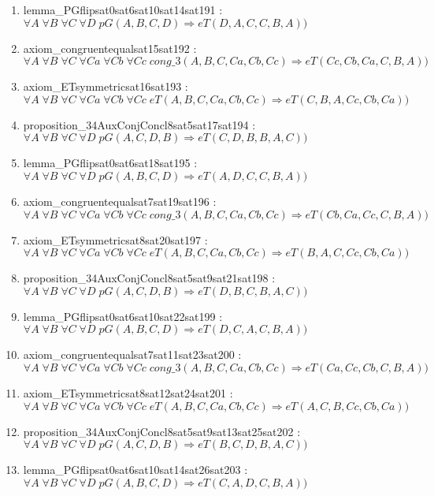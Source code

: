 \documentclass{article}
\begin{document}
\begin{enumerate}
\item lemma\_PGflipsat0sat6sat10sat14sat191 : $\forall A\;\forall B\;\forall C\;\forall D\;pG(A, B, C, D) \Rightarrow eT(D, A, C, C, B, A))$
\item axiom\_congruentequalsat15sat192 : $\forall A\;\forall B\;\forall C\;\forall Ca\;\forall Cb\;\forall Cc\;cong\_3(A, B, C, Ca, Cb, Cc) \Rightarrow eT(Cc, Cb, Ca, C, B, A))$
\item axiom\_ETsymmetricsat16sat193 : $\forall A\;\forall B\;\forall C\;\forall Ca\;\forall Cb\;\forall Cc\;eT(A, B, C, Ca, Cb, Cc) \Rightarrow eT(C, B, A, Cc, Cb, Ca))$
\item proposition\_34AuxConjConcl8sat5sat17sat194 : $\forall A\;\forall B\;\forall C\;\forall D\;pG(A, C, D, B) \Rightarrow eT(C, D, B, B, A, C))$
\item lemma\_PGflipsat0sat6sat18sat195 : $\forall A\;\forall B\;\forall C\;\forall D\;pG(A, B, C, D) \Rightarrow eT(A, D, C, C, B, A))$
\item axiom\_congruentequalsat7sat19sat196 : $\forall A\;\forall B\;\forall C\;\forall Ca\;\forall Cb\;\forall Cc\;cong\_3(A, B, C, Ca, Cb, Cc) \Rightarrow eT(Cb, Ca, Cc, C, B, A))$
\item axiom\_ETsymmetricsat8sat20sat197 : $\forall A\;\forall B\;\forall C\;\forall Ca\;\forall Cb\;\forall Cc\;eT(A, B, C, Ca, Cb, Cc) \Rightarrow eT(B, A, C, Cc, Cb, Ca))$
\item proposition\_34AuxConjConcl8sat5sat9sat21sat198 : $\forall A\;\forall B\;\forall C\;\forall D\;pG(A, C, D, B) \Rightarrow eT(D, B, C, B, A, C))$
\item lemma\_PGflipsat0sat6sat10sat22sat199 : $\forall A\;\forall B\;\forall C\;\forall D\;pG(A, B, C, D) \Rightarrow eT(D, C, A, C, B, A))$
\item axiom\_congruentequalsat7sat11sat23sat200 : $\forall A\;\forall B\;\forall C\;\forall Ca\;\forall Cb\;\forall Cc\;cong\_3(A, B, C, Ca, Cb, Cc) \Rightarrow eT(Ca, Cc, Cb, C, B, A))$
\item axiom\_ETsymmetricsat8sat12sat24sat201 : $\forall A\;\forall B\;\forall C\;\forall Ca\;\forall Cb\;\forall Cc\;eT(A, B, C, Ca, Cb, Cc) \Rightarrow eT(A, C, B, Cc, Cb, Ca))$
\item proposition\_34AuxConjConcl8sat5sat9sat13sat25sat202 : $\forall A\;\forall B\;\forall C\;\forall D\;pG(A, C, D, B) \Rightarrow eT(B, C, D, B, A, C))$
\item lemma\_PGflipsat0sat6sat10sat14sat26sat203 : $\forall A\;\forall B\;\forall C\;\forall D\;pG(A, B, C, D) \Rightarrow eT(C, A, D, C, B, A))$

\end{enumerate}
\end{document}

